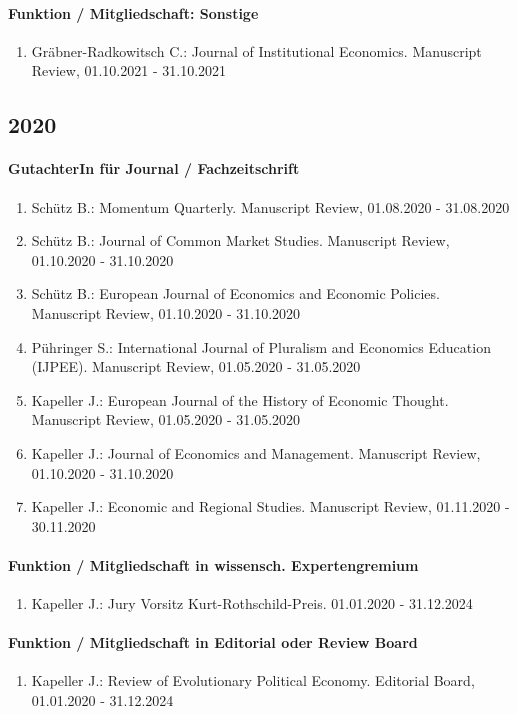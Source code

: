 \paragraph{Funktion / Mitgliedschaft: Sonstige}
\begin{enumerate}[leftmargin=*, labelsep=0.5cm]
\item Gräbner-Radkowitsch C.: Journal of Institutional Economics. Manuscript Review, 01.10.2021 - 31.10.2021
\end{enumerate}\subsection*{2020}\paragraph{GutachterIn für Journal / Fachzeitschrift}
\begin{enumerate}[leftmargin=*, labelsep=0.5cm]
\item Schütz B.: Momentum Quarterly. Manuscript Review, 01.08.2020 - 31.08.2020
\item Schütz B.: Journal of Common Market Studies. Manuscript Review, 01.10.2020 - 31.10.2020
\item Schütz B.: European Journal of Economics and Economic Policies. Manuscript Review, 01.10.2020 - 31.10.2020
\item Pühringer S.: International Journal of Pluralism and Economics Education (IJPEE). Manuscript Review, 01.05.2020 - 31.05.2020
\item Kapeller J.: European Journal of the History of Economic Thought. Manuscript Review, 01.05.2020 - 31.05.2020
\item Kapeller J.: Journal of Economics and Management. Manuscript Review, 01.10.2020 - 31.10.2020
\item Kapeller J.: Economic and Regional Studies. Manuscript Review, 01.11.2020 - 30.11.2020
\end{enumerate}
\paragraph{Funktion / Mitgliedschaft in wissensch. Expertengremium}
\begin{enumerate}[leftmargin=*, labelsep=0.5cm]
\item Kapeller J.: Jury Vorsitz Kurt-Rothschild-Preis. 01.01.2020 - 31.12.2024
\end{enumerate}
\paragraph{Funktion / Mitgliedschaft in Editorial oder Review Board}
\begin{enumerate}[leftmargin=*, labelsep=0.5cm]
\item Kapeller J.: Review of Evolutionary Political Economy. Editorial Board, 01.01.2020 - 31.12.2024
\end{enumerate}
